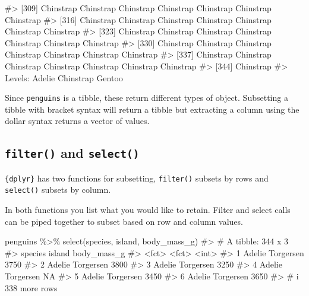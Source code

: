 \documentclass[
  letterpaper,
  DIV=11,
  numbers=noendperiod]{scrreprt}
\newenvironment{Shaded}{\begin{snugshade}}{\end{snugshade}}
\newcommand{\CommentTok}[1]{\textcolor[rgb]{0.37,0.37,0.37}{#1}}
\newcommand{\FunctionTok}[1]{\textcolor[rgb]{0.28,0.35,0.67}{#1}}
\newcommand{\NormalTok}[1]{\textcolor[rgb]{0.00,0.23,0.31}{#1}}
\newcommand{\SpecialCharTok}[1]{\textcolor[rgb]{0.37,0.37,0.37}{#1}}
\begin{document}
\begin{Shaded}
\begin{Highlighting}[]
\CommentTok{\#\textgreater{} [309] Chinstrap Chinstrap Chinstrap Chinstrap Chinstrap Chinstrap Chinstrap}
\CommentTok{\#\textgreater{} [316] Chinstrap Chinstrap Chinstrap Chinstrap Chinstrap Chinstrap Chinstrap}
\CommentTok{\#\textgreater{} [323] Chinstrap Chinstrap Chinstrap Chinstrap Chinstrap Chinstrap Chinstrap}
\CommentTok{\#\textgreater{} [330] Chinstrap Chinstrap Chinstrap Chinstrap Chinstrap Chinstrap Chinstrap}
\CommentTok{\#\textgreater{} [337] Chinstrap Chinstrap Chinstrap Chinstrap Chinstrap Chinstrap Chinstrap}
\CommentTok{\#\textgreater{} [344] Chinstrap}
\CommentTok{\#\textgreater{} Levels: Adelie Chinstrap Gentoo}
\end{Highlighting}
\end{Shaded}

Since \texttt{penguins} is a tibble, these return different types of
object. Subsetting a tibble with bracket syntax will return a tibble but
extracting a column using the dollar syntax returns a vector of values.

\subsection{\texorpdfstring{\texttt{filter()} and
\texttt{select()}}{filter() and select()}}\label{filter-and-select}

\texttt{\{dplyr\}} has two functions for subsetting, \texttt{filter()}
subsets by rows and \texttt{select()} subsets by column.

In both functions you list what you would like to retain. Filter and
select calls can be piped together to subset based on row and column
values.

\begin{Shaded}
\begin{Highlighting}[]
\NormalTok{penguins }\SpecialCharTok{\%\textgreater{}\%} 
  \FunctionTok{select}\NormalTok{(species, island, body\_mass\_g)}
\CommentTok{\#\textgreater{} \# A tibble: 344 x 3}
\CommentTok{\#\textgreater{}   species island    body\_mass\_g}
\CommentTok{\#\textgreater{}   \textless{}fct\textgreater{}   \textless{}fct\textgreater{}           \textless{}int\textgreater{}}
\CommentTok{\#\textgreater{} 1 Adelie  Torgersen        3750}
\CommentTok{\#\textgreater{} 2 Adelie  Torgersen        3800}
\CommentTok{\#\textgreater{} 3 Adelie  Torgersen        3250}
\CommentTok{\#\textgreater{} 4 Adelie  Torgersen          NA}
\CommentTok{\#\textgreater{} 5 Adelie  Torgersen        3450}
\CommentTok{\#\textgreater{} 6 Adelie  Torgersen        3650}
\CommentTok{\#\textgreater{} \# i 338 more rows}
\end{Highlighting}
\end{Shaded}
\end{document}
